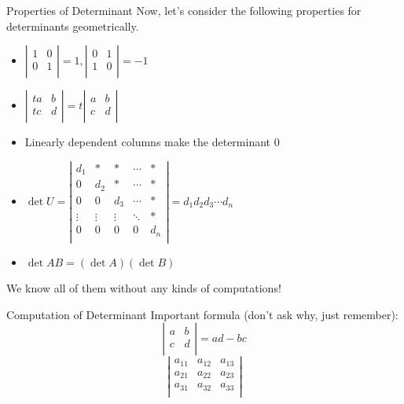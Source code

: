 \documentclass{beamer}
\begin{document}
\begin{frame}{Properties of Determinant}
Now, let's consider the following properties for determinants geometrically.
\begin{itemize}
    \item $\left| \begin{matrix}
        1&		0\\
        0&		1\\
    \end{matrix} \right|=1, \left| \begin{matrix}
        0&		1\\
        1&		0\\
    \end{matrix} \right|=-1$
    \item $\left| \begin{matrix}
        ta&		b\\
        tc&		d\\
    \end{matrix} \right|=t\left| \begin{matrix}
        a&		b\\
        c&		d\\
    \end{matrix} \right|$
    \item Linearly dependent columns make the determinant 0
    \item $\det U=\left| \begin{matrix}
        d_1&		\ast&		\ast&		\cdots&		\ast\\
        0&		d_2&		\ast&		\cdots&		\ast\\
        0&		0&		d_3&		\cdots&		\ast\\
        \vdots&		\vdots&		\vdots&		\ddots&		\ast\\
        0&		0&		0&		0&		d_n\\
    \end{matrix} \right|=d_1d_2d_3\cdots d_n$
    \item $\det AB=\left( \det A \right) \left( \det B \right)$
\end{itemize}

We know all of them without any kinds of computations!
\end{frame}

\begin{frame}{Computation of Determinant}
Important formula (don't ask why, just remember):
\begin{equation*}
    \left| \begin{matrix}
        a&		b\\
        c&		d\\
    \end{matrix} \right|=ad-bc
\end{equation*}
\begin{equation*}
    \left| \begin{matrix}
        a_{11}&		a_{12}&		a_{13}\\
        a_{21}&		a_{22}&		a_{23}\\
        a_{31}&		a_{32}&		a_{33}\\
    \end{matrix} \right|
\end{equation*}
\end{frame}
\end{document}
